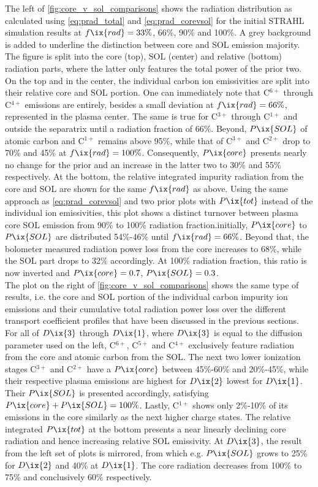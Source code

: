             The left of \cref{fig:core_v_sol_comparisons} shows the radiation distribution as calculated using \cref{eq:prad_total} and \cref{eq:prad_corevsol} for the initial STRAHL simulation results at $f\ix{rad}=33\%$, 66\%, 90\% and 100\%. A grey background is added to underline the distinction between core and SOL emission majority. The figure is split into the core (top), SOL (center) and relative (bottom) radiation parts, where the latter only features the total power of the prior two. On the top and in the center, the individual carbon ion emissivities are split into their relative core and SOL portion. One can immediately note that C$^{6+}$ through C$^{4+}$ emissions are entirely, besides a small deviation at $f\ix{rad}=66\%$, represented in the plasma center. The same is true for C$^{3+}$ through C$^{1+}$ and outside the separatrix until a radiation fraction of 66\%. Beyond, $P\ix{SOL}$ of atomic carbon and C$^{1+}$ remains above 95\%, while that of C$^{3+}$ and C$^{2+}$ drop to 70\% and 45\% at $f\ix{rad}=100\%$. Consequently, $P\ix{core}$ presents nearly no change for the prior and an increase in the latter two to 30\% and 55\% respectively. At the bottom, the relative integrated impurity radiation from the core and SOL are shown for the same $f\ix{rad}$ as above. Using the same approach as \cref{eq:prad_corevsol} and two prior plots with $P\ix{tot}$ instead of the individual ion emissivities, this plot shows a distinct turnover between plasma core SOL emission from 90\% to 100\% radiation fraction.initially, $P\ix{core}$ to $P\ix{SOL}$ are distributed 54\%-46\% until $f\ix{rad}=66\%$. Beyond that, the bolometer measured radiation power loss from the core increases to 68\%, while the SOL part drops to 32\% accordingly. At 100\% radiation fraction, this ratio is now inverted and $P\ix{core}=0.7$, $P\ix{SOL}=0.3$.\\%
            The plot on the right of \cref{fig:core_v_sol_comparisons} shows the same type of results, i.e. the core and SOL portion of the individual carbon impurity ion emissions and their cumulative total radiation power loss over the different transport coefficient profiles that have been discussed in the previous sections. For all of $D\ix{3}$ through $D\ix{1}$, where $D\ix{3}$ is equal to the diffusion parameter used on the left, C$^{6+}$, C$^{5+}$ and C$^{4+}$ exclusively feature radiation from the core and atomic carbon from the SOL. The next two lower ionization stages C$^{3+}$ and C$^{2+}$ have a $P\ix{core}$ between 45\%-60\% and 20\%-45\%, while their respective plasma emissions are highest for $D\ix{2}$ lowest for $D\ix{1}$. Their $P\ix{SOL}$ is presented accordingly, satisfying $P\ix{core}+P\ix{SOL}=100\%$. Lastly, C$^{1+}$ shows only 2\%-10\% of its emissions in the core similarly as the next higher charge states. The relative integrated $P\ix{tot}$ at the bottom presents a near linearly declining core radiation and hence increasing relative SOL emissivity. At $D\ix{3}$, the result from the left set of plots is mirrored, from which e.g. $P\ix{SOL}$ grows to 25\% for $D\ix{2}$ and 40\% at $D\ix{1}$. The core radiation decreases from 100\% to 75\% and conclusively 60\% respectively.\\%
